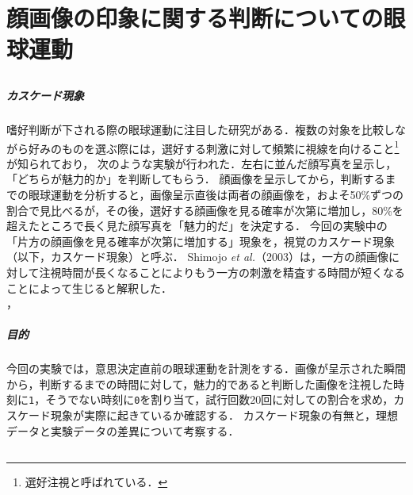 \chapter{顔画像の印象に関する判断についての眼球運動}
\section{\purpose}
\paragraph{カスケード現象}
嗜好判断が下される際の眼球運動に注目した研究がある．複数の対象を比較しながら好みのものを選ぶ際には，選好する刺激に対して頻繁に視線を向けること\footnote{選好注視と呼ばれている．}が知られており，
次のような実験が行われた．左右に並んだ顔写真を呈示し，「どちらが魅力的か」を判断してもらう．
顔画像を呈示してから，判断するまでの眼球運動を分析すると，画像呈示直後は両者の顔画像を，およそ50\%ずつの割合で見比べるが，その後，選好する顔画像を見る確率が次第に増加し，80\%を超えたところで長く見た顔写真を「魅力的だ」を決定する．
今回の実験中の「片方の顔画像を見る確率が次第に増加する」現象を，視覚のカスケード現象（以下，カスケード現象）と呼ぶ．
Shimojo \textit{et al.}（2003）は，一方の顔画像に対して注視時間が長くなることによりもう一方の刺激を精査する時間が短くなることによって生じると解釈した．\\
\hfill\cite[p.202]{美感}，\cite{潜在呈示した情報が選択判断時の視線の動きに与える影響}
\paragraph{目的}今回の実験では，意思決定直前の眼球運動を計測をする．画像が呈示された瞬間から，判断するまでの時間に対して，魅力的であると判断した画像を注視した時刻に\texttt{1}，そうでない時刻に\texttt{0}を割り当て，試行回数20回に対しての割合を求め，カスケード現象が実際に起きているか確認する．
カスケード現象の有無と，理想データと実験データの差異について考察する．
\section{\method}
\newcommand{\elt}{\texttt{Eye Link Ⅱ}}
\newcommand{\tobi}{\texttt{Tobii Grass 3}}
\newcommand{\csv}{\texttt{CSV}}
